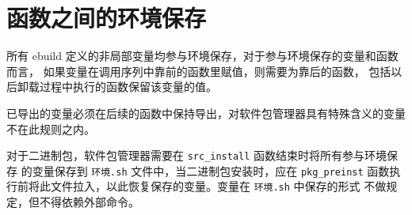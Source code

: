 \section{函数之间的环境保存}
\label{sec:ebuild-env-state}

所有 ebuild 定义的非局部变量均参与环境保存，对于参与环境保存的变量和函数而言，
如果变量在调用序列中靠前的函数里赋值，则需要为靠后的函数，
包括以后卸载过程中执行的函数保留该变量的值。

已导出的变量必须在后续的函数中保持导出，对软件包管理器具有特殊含义的变量不在此规则之内。

对于二进制包，软件包管理器需要在 \texttt{src_install} 函数结束时将所有参与环境保存
的变量保存到 \texttt{环境.sh} 文件中，当二进制包安装时，应在 \texttt{pkg_preinst}
函数执行前将此文件拉入，以此恢复保存的变量。变量在 \texttt{环境.sh} 中保存的形式
不做规定，但不得依赖外部命令。


